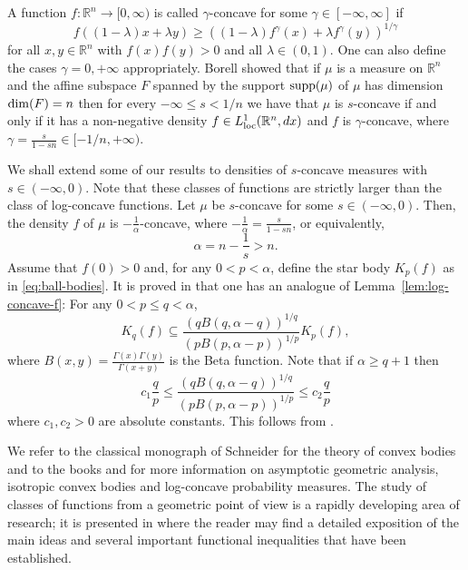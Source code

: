 \documentclass[11pt,leqno]{article}
\theoremstyle{definition}
\theoremstyle{remark}
\numberwithin{equation}{section}
\newcommand{\ls}{\leqslant}
\newcommand{\gr}{\geqslant}
\newcommand{\1}{\textbf{1}}
\begin{document}
A function $f:\mathbb R^n\to [0,\infty)$ is called $\gamma $-concave for some $\gamma\in [-\infty ,\infty ]$
if
\begin{equation*}f((1-\lambda )x+\lambda y)\gr
((1-\lambda )f^{\gamma }(x)+\lambda f^{\gamma }(y))^{1/\gamma }\end{equation*}
for all $x,y\in {\mathbb R}^n$ with $f(x)f(y)>0$ and all $\lambda\in (0,1)$. One can also
define the cases $\gamma =0,+\infty $ appropriately. Borell \cite{Borell-1975}
showed that if $\mu $ is a measure on ${\mathbb R}^n$ and the affine subspace $F$ spanned by the support
${\rm supp}(\mu )$ of $\mu $ has dimension ${\rm dim}(F)=n$ then for every $-\infty \ls s <1/n$ we have that
$\mu $ is $s$-concave if and only if it has a non-negative density $f\in L_{{\rm loc}}^1({\mathbb R}^n,dx)$
and $f$ is $\gamma $-concave, where $\gamma =\frac{s}{1-sn}\in [-1/n,+\infty )$.

We shall extend some of our results to densities of $s$-concave measures with $s\in (-\infty,0)$. Note that these classes of
functions are strictly larger than the class of log-concave functions. Let $\mu$ be $s$-concave for some $s\in (-\infty,0)$.
Then, the density $f$ of $\mu$ is $-\frac{1}{\alpha}$-concave,
where $\displaystyle -\frac{1}{\alpha}=\frac{s}{1-sn}$, or equivalently,
$$\alpha =n-\frac{1}{s}>n.$$
Assume that $f(0)>0$ and, for any $0<p<\alpha$, define the star body $K_p(f)$ as in \eqref{eq:ball-bodies}. It is proved
in \cite{Fradelizi-Guedon-Pajor-2014} that one has an analogue of Lemma~\ref{lem:log-concave-f}: For any $0<p\ls q<\alpha $,
\begin{equation}\label{eq:s<0}K_q(f)\subseteq \frac{(qB(q,\alpha -q))^{1/q}}{(pB(p,\alpha -p))^{1/p}}K_p(f),\end{equation}
where $\displaystyle B(x,y)=\frac{\Gamma(x)\Gamma(y)}{\Gamma(x+y)}$ is the Beta function. Note that if $\alpha\gr q+1$ then
$$c_1\frac{q}{p}\ls\frac{(qB(q,\alpha -q))^{1/q}}{(pB(p,\alpha -p))^{1/p}}\ls c_2\frac{q}{p}$$
where $c_1,c_2>0$ are absolute constants. This follows from \cite[Lemma~11]{Fradelizi-Guedon-Pajor-2014}.

We refer to the classical monograph of Schneider \cite{Schneider-book} for the theory of convex bodies and to
the books \cite{AGA-book} and \cite{BGVV-book} for more information on asymptotic geometric analysis, isotropic convex bodies and log-concave probability measures. The study of classes of functions from a geometric point of view is a rapidly developing area of research; it is presented in \cite[Chapter~9]{AGA-book-2} where the reader may find a detailed exposition of the main ideas and several important functional inequalities that have been established.
\end{document}
